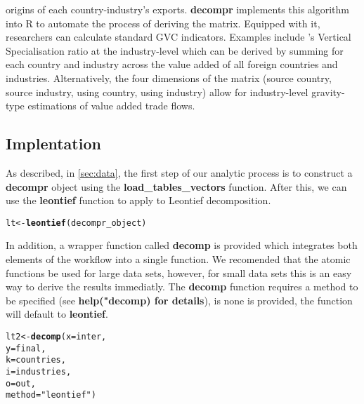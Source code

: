 \documentclass[a4paper]{article}\usepackage[]{graphicx}\usepackage[]{color}
\makeatletter
\newcommand{\hlstr}[1]{\textcolor[rgb]{0.192,0.494,0.8}{#1}}%
\newcommand{\hlstd}[1]{\textcolor[rgb]{0.345,0.345,0.345}{#1}}%
\newcommand{\hlkwb}[1]{\textcolor[rgb]{0.69,0.353,0.396}{#1}}%
\newcommand{\hlkwc}[1]{\textcolor[rgb]{0.333,0.667,0.333}{#1}}%
\newcommand{\hlkwd}[1]{\textcolor[rgb]{0.737,0.353,0.396}{\textbf{#1}}}%
\newenvironment{kframe}{%
 \def\at@end@of@kframe{}%
 \ifinner\ifhmode%
  \def\at@end@of@kframe{\end{minipage}}%
  \begin{minipage}{\columnwidth}%
 \fi\fi%
 \def\FrameCommand##1{\hskip\@totalleftmargin \hskip-\fboxsep
 \colorbox{shadecolor}{##1}\hskip-\fboxsep
     \hskip-\linewidth \hskip-\@totalleftmargin \hskip\columnwidth}%
 \MakeFramed {\advance\hsize-\width
   \@totalleftmargin\z@ \linewidth\hsize
   \@setminipage}}%
 {\par\unskip\endMakeFramed%
 \at@end@of@kframe}
\newenvironment{knitrout}{}{} %
\makeatother
\begin{document}
origins of each country-industry's exports.
\textbf{decompr} implements this algorithm into R to automate the process of deriving the matrix. Equipped with it, researchers can calculate standard GVC indicators.
Examples include \citet{dahuetal01}'s Vertical Specialisation ratio at the industry-level which can be derived by summing for each country and industry across the value added of all foreign countries and industries.
Alternatively, the four dimensions of the matrix (source country, source industry, using country, using industry) allow for industry-level gravity-type estimations of value added trade flows.

\subsection{Implentation}
As described, in \cref{sec:data}, the first step of our analytic process is to construct a \textbf{decompr} object using the \textbf{load\_tables\_vectors} function. After this, we can use the \textbf{leontief} function to apply to Leontief decomposition.
\begin{knitrout}
\color{fgcolor}\begin{kframe}
\begin{alltt}
\hlstd{lt} \hlkwb{<-} \hlkwd{leontief}\hlstd{( decompr_object )}
\end{alltt}
\end{kframe}
\end{knitrout}

In addition, a wrapper function called \textbf{decomp} is provided which integrates both elements of the workflow into a single function.
We recomended that the atomic functions be used for large data sets, however, for small data sets this is an easy way to derive the results immediatly.
The \textbf{decomp} function requires a method to be specified (see \textbf{help("decomp) for details}), is none is provided, the function will default to \textbf{leontief}.

\begin{knitrout}
\color{fgcolor}\begin{kframe}
\begin{alltt}
\hlstd{lt2} \hlkwb{<-} \hlkwd{decomp}\hlstd{(} \hlkwc{x} \hlstd{= inter,}
               \hlkwc{y} \hlstd{= final,}
               \hlkwc{k} \hlstd{= countries,}
               \hlkwc{i} \hlstd{= industries,}
               \hlkwc{o} \hlstd{= out,}
               \hlkwc{method} \hlstd{=} \hlstr{"leontief"} \hlstd{)}
\end{alltt}
\end{kframe}
\end{knitrout}
\end{document}
